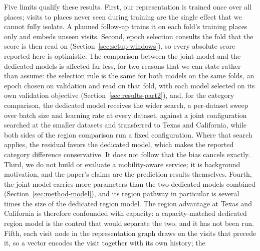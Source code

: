 
Five limits qualify these results. First, our representation is trained once over all places; visits to places
never seen during training are the single effect that we cannot fully isolate. A planned follow-up trains it on each
fold's training places only and embeds unseen visits. Second, epoch selection consults the fold that the score is then
read on
(Section~\ref{sec:setup-windows}), so every absolute score reported here is optimistic. The
comparison between the joint model and the dedicated models is affected far less, for two reasons
that we can state rather than assume: the selection rule is the same for both models on the
same folds, an epoch chosen on validation and read on that fold, with each model selected on its own
validation objective (Section~\ref{sec:results-part2}), and, for the category comparison, the dedicated
model receives the wider search, a per-dataset sweep over batch size and
learning rate at every dataset, against a joint configuration searched at the smaller datasets and
transferred to Texas and California, while both sides of the region comparison run a fixed
configuration. Where that search applies, the residual
favors the dedicated model, which makes the reported category difference conservative. It does
not follow that the bias cancels exactly. Third, we do not build or evaluate a mobility-aware service; it is background
motivation, and the paper's claims are the prediction results themselves. Fourth, the joint model carries more parameters than the two
dedicated models combined (Section~\ref{sec:method-model}), and its region pathway in particular is
several times the size of the dedicated region model. The region advantage at Texas and California is
therefore confounded with capacity: a capacity-matched dedicated region model is the control that
would separate the two, and it has not been run. Fifth, each visit node in the representation graph
draws on the visits that precede it, so a vector encodes the visit together with its own history; the
